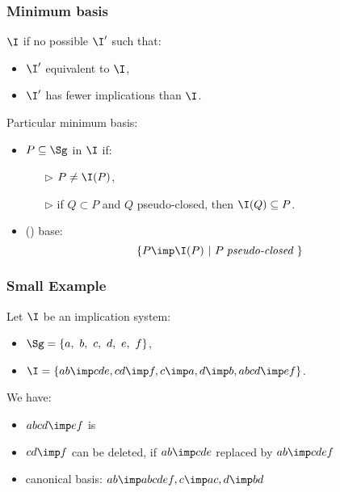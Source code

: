 \begin{frame}
\frametitle{Minimum basis}

$\I$  if no possible $\I'$ such that:
\begin{itemize}
	\item $\I'$ equivalent to $\I$,
	\item $\I'$ has fewer implications than $\I$.
\end{itemize}

\vspace{1.2em}

Particular minimum basis:
\begin{itemize}
	\item $P \subseteq \Sg$  in $\I$ if:
		\begin{itemize}
			\item[\color{belize} $\triangleright$] $P \neq \I(P)$,
			\item[\color{belize} $\triangleright$] if $Q \subset P$ and $Q$ pseudo-closed, then $\I(Q) \subseteq P$.
		\end{itemize}
	\item {} () base:
		\[ \{ P \imp \I(P) \ | \ P \; \textit{pseudo-closed } \} \]
\end{itemize} 

\end{frame}


\begin{frame}
\frametitle{Small Example}

Let $\I$ be an implication system:
\begin{itemize}
	\item $\Sg = \{ a, \ b, \ c, \ d, \ e, \ f \}$,
	\item $\I = \{ ab \imp cde, cd \imp f, c \imp a, d \imp b, abcd \imp ef \}$.
\end{itemize}

\vspace{1.2em}

We have:
\begin{itemize}
	\item $abcd \imp ef$ is 
	\item $cd \imp f$ can be deleted, if $ab \imp cde$ replaced by $ab \imp cdef$
	\item canonical basis: $ab \imp abcdef, c \imp ac, d \imp bd$
\end{itemize}

\end{frame}
